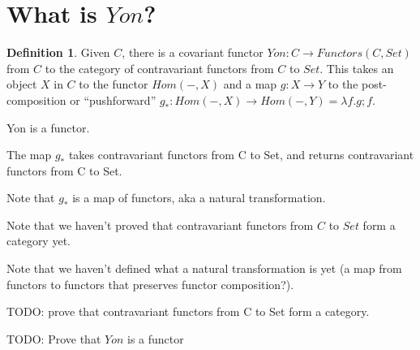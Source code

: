 \documentclass{proc-l}
\theoremstyle{definition}
\newtheorem{definition}[theorem]{Definition}
\theoremstyle{remark}
\numberwithin{equation}{section}
\begin{document}
\section{What is $Yon$?}

\begin{definition}
\label{yondefn}
Given $C$, there is a covariant functor $Yon: C \rightarrow Functors(C,Set)$ from $C$ to the category of contravariant functors from $C$ to $Set$. This takes an object $X$ in $C$ to the functor $Hom(-,X)$ and a map $g: X \rightarrow Y$ to the post-composition or ``pushforward'' $g_*: Hom(-,X) \rightarrow Hom(-,Y) = \lambda f . g; f$.  
\end{definition}

Yon is a functor.

The map $g_*$ takes contravariant functors from C to Set,
and returns contravariant functors from C to Set.

Note that $g_*$ is a map of functors, aka a natural transformation.

Note that we haven't proved that contravariant functors from $C$ to $Set$ form a category yet.

Note that we haven't defined what a natural transformation is yet (a map from functors to functors that preserves functor composition?). 

TODO: prove that contravariant functors from C to Set form a category. 


TODO: Prove that $Yon$ is a functor

\end{document}
